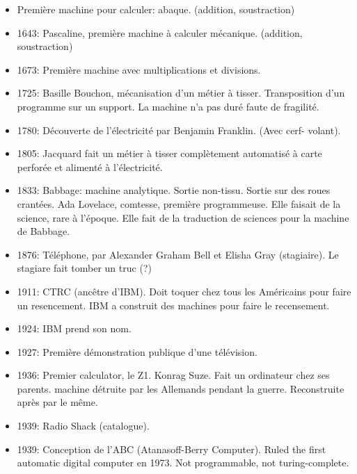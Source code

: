 \documentclass[a4paper,11pt]{article}
\begin{document}
\begin{itemize}

\item Première machine pour calculer: abaque. (addition, soustraction)

\item 1643: Pascaline, première machine à calculer mécanique. (addition,
  soustraction)

\item 1673: Première machine avec multiplications et divisions.

\item 1725: Basille Bouchon, mécanisation d'un métier à tisser. Transposition
  d'un programme sur un support. La machine n'a pas duré faute de fragilité.

\item 1780: Découverte de l'électricité par Benjamin Franklin. (Avec cerf-
  volant).

\item 1805: Jacquard fait un métier à tisser complètement automatisé à carte
  perforée   et alimenté à l'électricité.

\item 1833: Babbage: machine analytique. Sortie non-tissu. Sortie sur des roues
  crantées. Ada Lovelace, comtesse, première programmeuse. Elle faisait de la
  science, rare à l'époque. Elle fait de la traduction de sciences pour la
  machine de Babbage.

\item 1876: Téléphone, par Alexander Graham Bell et Elisha Gray (stagiaire).
  Le stagiare fait tomber un truc  (?)

\item 1911: CTRC (ancêtre d'IBM). Doit toquer chez tous les Américains pour
  faire un resencement.
  IBM a construit des machines pour faire le recensement.

\item 1924: IBM prend son nom.

\item 1927: Première démonstration publique d'une télévision.

\item 1936: Premier calculator, le Z1. Konrag Suze. Fait un ordinateur chez
  ses parents. machine détruite par les Allemands pendant la guerre.
  Reconstruite après par le même.

\item 1939: Radio Shack (catalogue).

\item 1939: Conception de l'ABC (Atanasoff-Berry Computer). Ruled the first automatic
  digital computer en 1973. Not programmable, not turing-complete.


\end{itemize}
\end{document}
